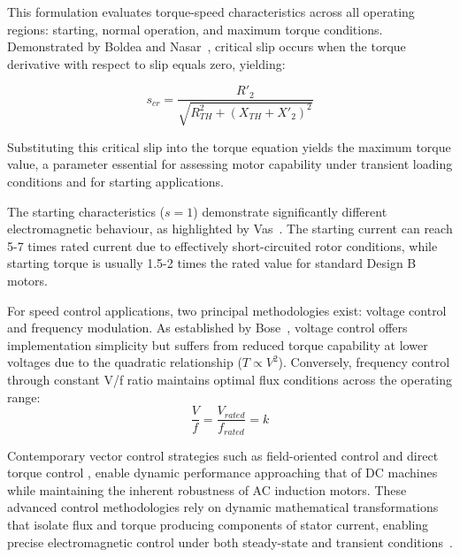 \documentclass[a4paper,11pt]{IEEEtran}
\begin{document}
This formulation evaluates torque-speed characteristics across all operating regions: starting, normal operation, and maximum torque conditions. Demonstrated by Boldea and Nasar~\cite{boldea2021}, critical slip occurs when the torque derivative with respect to slip equals zero, yielding:

\begin{equation}
s_{cr} = \frac{R'_2}{\sqrt{R_{TH}^2 + (X_{TH} + X'_2)^2}}
\end{equation}

Substituting this critical slip into the torque equation yields the maximum torque value, a parameter essential for assessing motor capability under transient loading conditions and for starting applications.









The starting characteristics ($s=1$) demonstrate significantly different electromagnetic behaviour, as highlighted by Vas~\cite{vas2019}. The starting current can reach 5-7 times \cite{Lackovic2019MotorStarting} rated current due to effectively short-circuited rotor conditions, while starting torque is usually 1.5-2 times \cite{Yaskawa2006MotorStarting} the rated value for standard Design B motors.

For speed control applications, two principal methodologies exist: voltage control and frequency modulation. As established by Bose~\cite{bose2020}, voltage control offers implementation simplicity but suffers from reduced torque capability at lower voltages due to the quadratic relationship ($T \propto V^2$)\cite{Osorno2018VectorControl}. Conversely, frequency control through constant V/f ratio maintains optimal flux conditions across the operating range\cite{Asuri2006ControlScheme}:
\begin{equation}
\frac{V}{f} = \frac{V_{rated}}{f_{rated}} = k
\end{equation}

Contemporary vector control strategies such as field-oriented control \cite{Begh2024FOCDTC} and direct torque control \cite{Gudey2023DTC}, enable dynamic performance approaching that of DC machines while maintaining the inherent robustness of AC induction motors. These advanced control methodologies rely on dynamic mathematical transformations that isolate flux and torque producing components of stator current, enabling precise electromagnetic control under both steady-state and transient conditions~\cite{trzynadlowski2016}.
\end{document}
